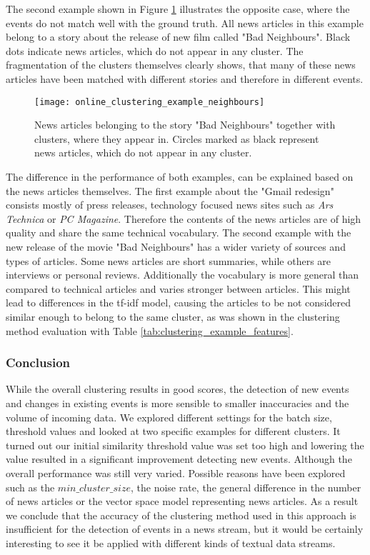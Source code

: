 The second example shown in Figure \ref{fig:online_clustering_example_neighbours} illustrates the opposite case, where the events do not match well with the ground truth. All news articles in this example belong to a story about the release of new film called "Bad Neighbours". Black dots indicate news articles, which do not appear in any cluster. The fragmentation of the clusters themselves clearly shows, that many of these news articles have been matched with different stories and therefore in different events. 

\begin{figure}[h]
    \centering
    \texttt{[image: online\_clustering\_example\_neighbours]}
    \caption{News articles belonging to the story "Bad Neighbours" together with clusters, where they appear in. Circles marked as black represent news articles, which do not appear in any cluster.}
    \label{fig:online_clustering_example_neighbours}
\end{figure}

The difference in the performance of both examples, can be explained based on the news articles themselves. The first example about the "Gmail redesign" consists mostly of press releases, technology focused news sites such as \textit{Ars Technica} or \textit{PC Magazine}. Therefore the contents of the news articles are of high quality and share the same technical vocabulary. The second example with the new release of the movie "Bad Neighbours" has a wider variety of sources and types of articles. Some news articles are short summaries, while others are interviews or personal reviews. Additionally the vocabulary is more general than compared to technical articles and varies stronger between articles. This might lead to differences in the tf-idf model, causing the articles to be not considered similar enough to belong to the same cluster, as was shown in the clustering method evaluation with Table \ref{tab:clustering_example_features}.

\subsubsection{Conclusion}

While the overall clustering results in good scores, the detection of new events and changes in existing events is more sensible to smaller inaccuracies and the volume of incoming data. We explored different settings for the batch size, threshold values and looked at two specific examples for different clusters. It turned out our initial similarity threshold value was set too high and lowering the value resulted in a significant improvement detecting new events. Although the overall performance was still very varied. Possible reasons have been explored such as the $min\_cluster\_size$, the noise rate, the general difference in the number of news articles or the vector space model representing news articles. As a result we conclude that the accuracy of the clustering method used in this approach is insufficient for the detection of events in a news stream, but it would be certainly interesting to see it be applied with different kinds of textual data streams. 